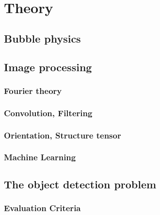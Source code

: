 \chapter{Theory}
	\section{Bubble physics}
	\section{Image processing}
		\subsection{Fourier theory}
		\subsection{Convolution, Filtering}
		\subsection{Orientation, Structure tensor}
		\subsection{Machine Learning}

	\section{The object detection problem}
		\subsection{Evaluation Criteria}
